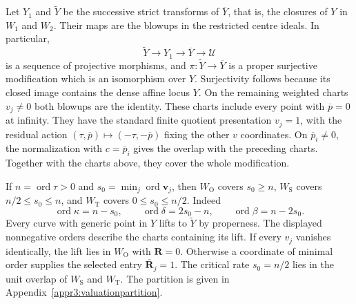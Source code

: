\documentclass[11pt,a4paper]{article}
\numberwithin{equation}{section}
\theoremstyle{plain}
\theoremstyle{definition}
\theoremstyle{remark}
\begin{document}
Let $Y_1$ and $\widetilde Y$ be the successive strict transforms of
$\overline Y$, that is, the closures of $Y$ in $W_1$ and $W_2$.
Their maps are the blowups in the restricted centre ideals.
In particular,
\[
 \widetilde Y\longrightarrow Y_1\longrightarrow\overline Y
                      \longrightarrow\mathscr U
\]
is a sequence of projective morphisms, and
$\pi:\widetilde Y\to\overline Y$ is a proper surjective modification
which is an isomorphism over $Y$. Surjectivity follows because its
closed image contains the dense affine locus $Y$.
On the remaining weighted charts $v_j\ne0$ both blowups are the
identity. These charts include every point with
$\overline p=0$ at infinity. They have the standard finite quotient
presentation $v_j=1$, with the residual action
$(\tau,\overline p)\mapsto(-\tau,-\overline p)$ fixing the other
$v$ coordinates. On $\overline p_i\ne0$, the normalization with
$c=\overline p_i$ gives the overlap with the preceding charts.
Together with the charts above, they cover the whole modification.

If
$n=\operatorname{ord}\tau>0$ and
$s_0=\min_j\operatorname{ord}\boldsymbol v_j$, then
$W_{\mathrm O}$ covers $s_0\ge n$, $W_{\mathrm S}$ covers
$n/2\le s_0\le n$, and $W_{\mathrm T}$ covers $0\le s_0\le n/2$. Indeed
\[
 \operatorname{ord}\kappa=n-s_0,\qquad
 \operatorname{ord}\delta=2s_0-n,\qquad
 \operatorname{ord}\beta=n-2s_0.
\]
Every curve with generic point in $Y$ lifts to $\widetilde Y$ by
properness. The displayed nonnegative orders describe the charts
containing its lift. If every $v_j$ vanishes identically, the lift
lies in $W_{\mathrm O}$ with $\boldsymbol R=0$.
Otherwise a coordinate of minimal order supplies the selected entry
$\overline{\boldsymbol R}_j=1$.
The critical rate $s_0=n/2$ lies in the unit overlap of
$W_{\mathrm S}$ and $W_{\mathrm T}$.
The partition is given in
Appendix~\ref{appr3:valuationpartition}.
\end{document}
